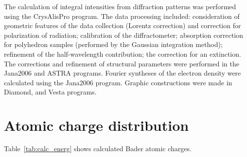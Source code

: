 \documentclass[preprint,review,12pt]{elsarticle}
\begin{document}
The calculation of integral intensities from diffraction patterns was performed using the CrysAlisPro program\cite{Rigaku}.
The data processing included: consideration of geometric features of the data collection (Lorentz correction) and correction for polarization of radiation; calibration of the diffractometer\cite{Dudka2010}; absorption correction for polyhedron samples (performed by the Gaussian integration method\cite{Busing1957}); refinement of the half-wavelength contribution\cite{Dudka2010_2}; the correction for an extinction\cite{Becker1974}.
The corrections and refinement of structural parameters were performed in the Jana2006\cite{Petek2014} and ASTRA programs\cite{Dudka2007}.
Fourier syntheses of the electron density were calculated using the Jana2006 program\cite{Petek2014}.
Graphic constructions were made in Diamond\cite{Diamont}, and Vesta programs\cite{Momma2011}.


\section{Atomic charge distribution}\label{sec:level1}

Table~\ref{tab:calc_energ} shows calculated Bader atomic charges.
\end{document}
